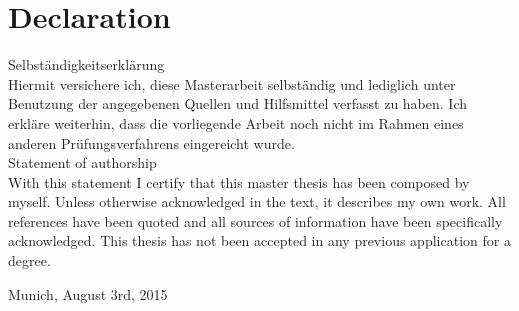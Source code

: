 \chapter*{Declaration}
\thispagestyle{empty}

Selbst{\"a}ndigkeitserkl{\"a}rung \\
Hiermit versichere ich, diese Masterarbeit selbst{\"a}ndig und lediglich unter Benutzung der angegebenen Quellen und Hilfsmittel verfasst zu haben. 
Ich erkl{\"a}re weiterhin, dass die vorliegende Arbeit noch nicht im Rahmen eines anderen Pr{\"u}fungsverfahrens eingereicht wurde.\\

\noindent Statement of authorship \\
With this statement I certify that this master thesis has been composed by myself. Unless otherwise acknowledged in the text, it describes my own work. All references have been quoted and all sources of information have been specifically acknowledged. This thesis has not been accepted in any previous application for a degree.  

Munich, August 3rd, 2015